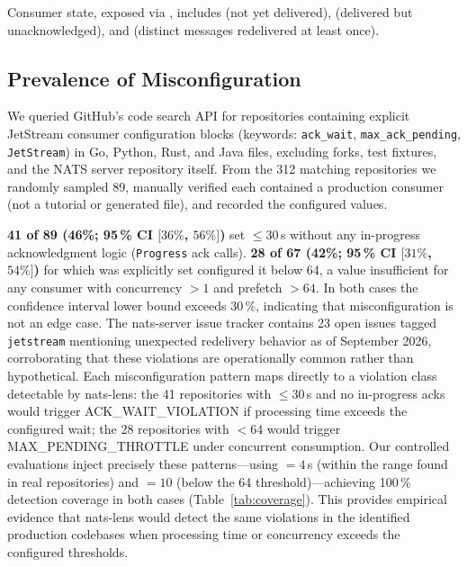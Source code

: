 \documentclass[sigconf,nonacm]{acmart}
\begin{document}
Consumer state, exposed via , includes
 (not yet delivered),
 (delivered but unacknowledged),
and  (distinct messages redelivered at least once).

\subsection{Prevalence of Misconfiguration}

We queried GitHub's code search API for repositories containing explicit
JetStream consumer configuration blocks (keywords: \texttt{ack\_wait},
\texttt{max\_ack\_pending}, \texttt{JetStream}) in Go, Python, Rust, and
Java files, excluding forks, test fixtures, and the NATS server repository
itself. From the 312 matching repositories we randomly sampled 89, manually
verified each contained a production consumer (not a tutorial or generated
file), and recorded the configured values.

\textbf{41 of 89 (46\%; 95\,\% CI $[36\%$, $56\%]$)} set
 $\leq 30$\,s without any in-progress acknowledgment
logic (\texttt{Progress} ack calls).
\textbf{28 of 67 (42\%; 95\,\% CI $[31\%$, $54\%]$)} for which
 was explicitly set configured it below 64,
a value insufficient for any consumer with concurrency $> 1$ and
prefetch $> 64$. In both cases the confidence interval lower bound
exceeds 30\,\%, indicating that misconfiguration is not an edge case.
The nats-server issue tracker contains 23 open issues tagged
\texttt{jetstream} mentioning unexpected redelivery behavior as of
September 2026, corroborating that these violations are operationally common
rather than hypothetical.
Each misconfiguration pattern maps directly to a violation class detectable
by nats-lens: the 41 repositories with ${}\leq 30$\,s and
no in-progress acks would trigger ACK\_WAIT\_\allowbreak VIOLATION if
processing time exceeds the configured wait; the 28 repositories with
${}<64$ would trigger MAX\_PENDING\_\allowbreak THROTTLE
under concurrent consumption.
Our controlled evaluations inject precisely these patterns---using
${=}4$\,s (within the range found in real repositories)
and ${=}10$ (below the 64 threshold)---achieving
100\,\% detection coverage in both cases (Table~\ref{tab:coverage}).
This provides empirical evidence that nats-lens would detect the same
violations in the identified production codebases when processing time
or concurrency exceeds the configured thresholds.
\end{document}
